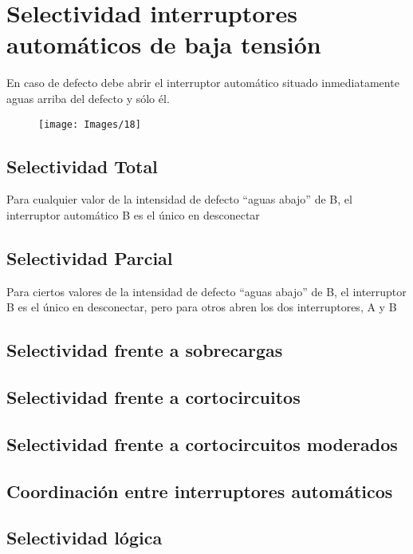 \chapter{Selectividad interruptores automáticos de baja tensión}
En caso de defecto debe abrir el interruptor automático situado inmediatamente aguas arriba del defecto y sólo él.
\begin{figure}[H]
	\centering
	\texttt{[image: Images/18]}
\end{figure}
\section{Selectividad Total}
Para cualquier valor de la intensidad de defecto “aguas abajo” de B, el interruptor automático B es el único en desconectar 
\section{Selectividad Parcial}
Para ciertos valores de la intensidad de defecto “aguas abajo” de B, el interruptor B es el único en desconectar, pero para otros abren los dos interruptores, A y B
\section{Selectividad frente a sobrecargas}
\section{Selectividad frente a cortocircuitos}
\section{Selectividad frente a cortocircuitos moderados}
\section{Coordinación entre interruptores automáticos}
\section{Selectividad lógica}